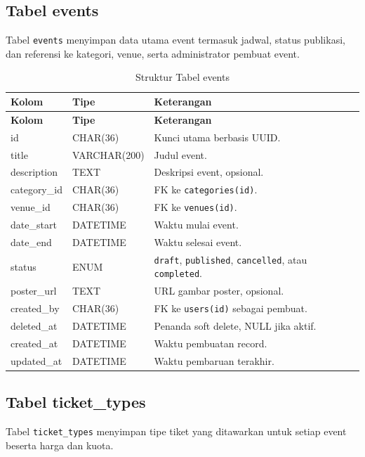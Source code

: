 \documentclass[12pt,a4paper]{report}
\begin{document}
\subsection{Tabel events}
Tabel \texttt{events} menyimpan data utama event termasuk jadwal, status publikasi, dan referensi ke kategori, venue, serta administrator pembuat event.

\begin{longtable}{p{3.6cm} p{3.6cm} p{8.5cm}}
\caption{Struktur Tabel events} \label{tab:events} \\
\toprule
\textbf{Kolom} & \textbf{Tipe} & \textbf{Keterangan} \\
\midrule
\endfirsthead
\toprule
\textbf{Kolom} & \textbf{Tipe} & \textbf{Keterangan} \\
\midrule
\endhead
\bottomrule
\endfoot
id            & CHAR(36)     & Kunci utama berbasis UUID. \\
title         & VARCHAR(200) & Judul event. \\
description   & TEXT         & Deskripsi event, opsional. \\
category\_id  & CHAR(36)     & FK ke \texttt{categories(id)}. \\
venue\_id     & CHAR(36)     & FK ke \texttt{venues(id)}. \\
date\_start   & DATETIME     & Waktu mulai event. \\
date\_end     & DATETIME     & Waktu selesai event. \\
status        & ENUM         & \texttt{draft}, \texttt{published}, \texttt{cancelled}, atau \texttt{completed}. \\
poster\_url   & TEXT         & URL gambar poster, opsional. \\
created\_by   & CHAR(36)     & FK ke \texttt{users(id)} sebagai pembuat. \\
deleted\_at   & DATETIME     & Penanda soft delete, NULL jika aktif. \\
created\_at   & DATETIME     & Waktu pembuatan record. \\
updated\_at   & DATETIME     & Waktu pembaruan terakhir. \\
\end{longtable}

\subsection{Tabel ticket\_types}
Tabel \texttt{ticket\_types} menyimpan tipe tiket yang ditawarkan untuk setiap event beserta harga dan kuota.
\end{document}
